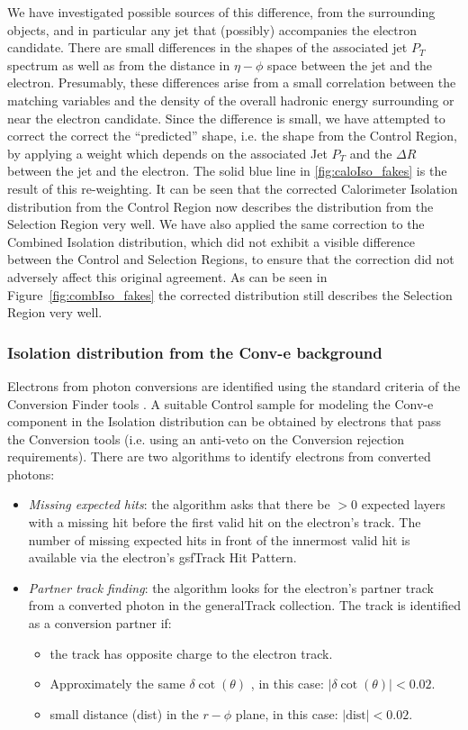 We have investigated possible sources of this difference, from the surrounding objects, and in particular any jet that (possibly) accompanies the electron candidate.  There are small differences in the shapes of the associated jet $P_T$ spectrum as well as from the distance in $\eta-\phi$ space between the jet and the electron.  Presumably, these differences arise from a small correlation between the matching variables and the density of the overall hadronic energy surrounding or near the electron candidate.  Since the difference is small, we have attempted to correct the correct the ``predicted'' shape, i.e. the shape from the Control Region, by applying a weight which depends on the associated Jet $P_T$ and the $\Delta R$ between the jet and the electron.  The solid blue line in \ref{fig:caloIso_fakes} is the result of this re-weighting.  It can be seen that the corrected Calorimeter Isolation distribution from the Control Region now describes the distribution from the Selection Region very well.  We have also applied the same correction to the Combined Isolation distribution, which did not exhibit a visible difference between the Control and Selection Regions, to ensure that the correction did not adversely affect this original agreement.  As can be seen in Figure~\ref{fig:combIso_fakes} the corrected distribution still describes the Selection Region very well.

\subsubsection{Isolation distribution from the Conv-e background}

Electrons from photon conversions are identified using the standard criteria of the Conversion Finder tools \cite{conv}. A suitable Control sample for modeling the Conv-e component in the Isolation distribution can be obtained by electrons that pass the Conversion tools (i.e. using an anti-veto on the Conversion rejection requirements). There are two algorithms to identify electrons from converted photons:

\begin{itemize} 
\item \textit{Missing expected hits}: the algorithm asks that there be $> 0$ expected layers with a missing hit before the first valid hit on the electron's track. The number of missing expected hits in front of the innermost valid hit is available via the electron's gsfTrack Hit Pattern.
\item \textit{Partner track finding}: the algorithm looks for the electron's partner track from a converted photon in the generalTrack collection. The track is identified as a conversion partner if: 
\begin{itemize}
\item the track has opposite charge to the electron track.
\item Approximately the same $\delta \cot(\theta)$ , in this case: $|\delta \cot(\theta)| < 0.02$.
\item small distance (dist) in the $r-\phi$ plane, in this case: $|\text{dist}| < 0.02$. 
\end{itemize}
\end{itemize}


